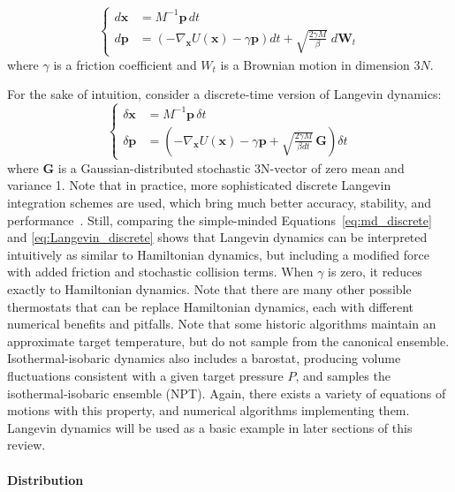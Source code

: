 \documentclass[9pt,review]{livecoms}
\newcommand{\vx}{\mathbf{x}}
\newcommand{\vp}{\mathbf{p}}
\begin{document}
\begin{equation}
\left\{
\begin{array}{ll}
    d\vx &= M^{-1} \vp \,  dt \\
    d\vp &= \left(-\nabla_\vx U(\vx) - \gamma \vp \right) dt
    + \sqrt{ \frac{2 \gamma M}{\beta}} \; d\mathbf{W}_t
\end{array}
\right.
\end{equation}
where $\gamma$ is a friction coefficient and ${W}_t$ is a Brownian motion in dimension $3N$.

For the sake of intuition, consider a discrete-time version of Langevin dynamics:
\begin{equation}
\left\{
\begin{array}{ll}
    \delta\vx &= M^{-1} \vp \, \delta t \\
    \delta\vp &= \left(-\nabla_\vx U(\vx) - \gamma \vp + \sqrt{ \frac{2 \gamma M}{ \beta dt}} \, \mathbf{G} \right) \delta t
    \label{eq:Langevin_discrete}
\end{array}
\right.
\end{equation}
where $\mathbf{G}$ is a Gaussian-distributed stochastic 3N-vector of zero mean and variance 1.
Note that in practice, more sophisticated discrete Langevin integration schemes are used, which bring much better accuracy, stability, and performance~\cite{Skeel2002, Leimkuhler2012}.
Still, comparing the simple-minded Equations~\ref{eq:md_discrete} and \ref{eq:Langevin_discrete} shows that Langevin dynamics can be interpreted intuitively as similar to Hamiltonian dynamics, but including a modified force with added friction and stochastic collision terms. When $\gamma$ is zero, it reduces exactly to Hamiltonian dynamics.
Note that there are many other possible thermostats that can be replace Hamiltonian dynamics, each with different numerical benefits and pitfalls. Note that some historic algorithms maintain an approximate target temperature, but do not sample from the canonical ensemble.
Isothermal-isobaric dynamics also includes a barostat, producing volume fluctuations consistent with a given target pressure $P$, and samples the isothermal-isobaric ensemble (NPT).
Again, there exists a variety of equations of motions with this property, and numerical algorithms implementing them. Langevin dynamics will be used as a basic example in later sections of this review.

\hypertarget{ref:Distribution}{\paragraph{Distribution}}
\end{document}
